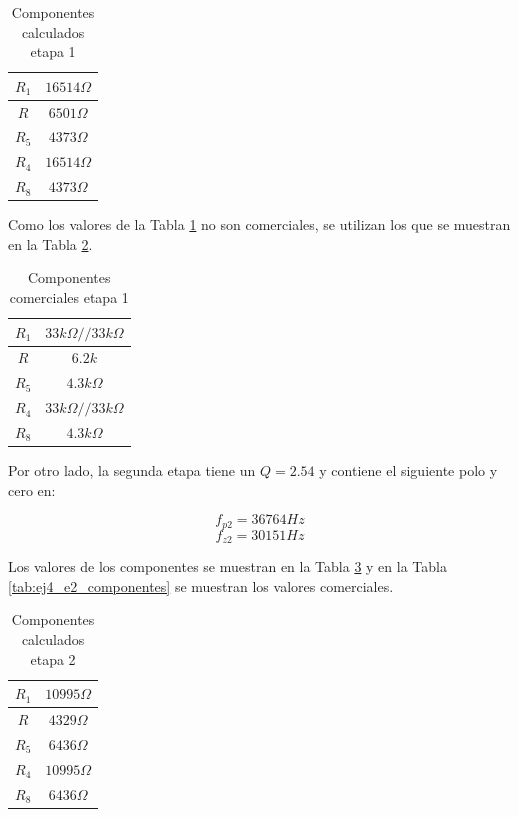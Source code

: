 \begin{table}[h!]
    \centering
    \begin{tabular}{|c|c|}
    \hline
    $R_1$ & $16514 \Omega$ \\ \hline
    $R$   & $6501\Omega$   \\ \hline
    $R_5$ & $4373 \Omega$  \\ \hline
    $R_4$ & $16514 \Omega$ \\ \hline

    $R_8$ & $4373 \Omega$ \\ \hline
    \end{tabular}
    \caption{Componentes calculados etapa 1}
    \label{tab:ej4_e1_componentes_calculados}
    \end{table}

Como los valores de la Tabla \ref{tab:ej4_e1_componentes_calculados} no son comerciales, se utilizan los que se muestran en la Tabla \ref{tab:ej4_e1_componentes}.

\begin{table}[h!]
    \centering
    \begin{tabular}{|c|c|}
    \hline
    $R_1$ & $33k\Omega // 33k\Omega$ \\ \hline
    $R$   & $6.2k$   \\ \hline
    $R_5$ & $4.3k \Omega$  \\ \hline
    $R_4$ & $33k\Omega // 33k\Omega$ \\ \hline
    $R_8$ & $4.3k \Omega$ \\ \hline
    \end{tabular}
    \caption{Componentes comerciales etapa 1}
    \label{tab:ej4_e1_componentes}
    \end{table}


Por otro lado, la segunda etapa tiene un $Q = 2.54$ y contiene el siguiente polo y cero en:

\begin{displaymath}  f_{p2}   = 36764 Hz\end{displaymath} 
\begin{displaymath}  f_{z2}   = 30151 Hz\end{displaymath} 

Los valores de los componentes se muestran en la Tabla \ref{tab:ej4_e2_componentes_calculados} y en la Tabla \ref{tab:ej4_e2_componentes} se muestran los valores comerciales.

\begin{table}[h!]
    \centering
    \begin{tabular}{|c|c|}
    \hline
    $R_1$ & $ 10995 \Omega$ \\ \hline
    $R$   & $4329\Omega$   \\ \hline
    $R_5$ & $6436 \Omega$  \\ \hline
    $R_4$ & $10995 \Omega$ \\ \hline
    $R_8$ & $6436 \Omega$ \\ \hline
    \end{tabular}
    \caption{Componentes calculados etapa 2}
    \label{tab:ej4_e2_componentes_calculados}
    \end{table} 


